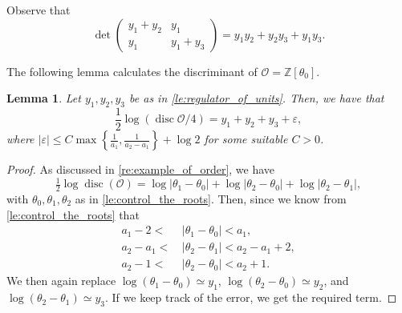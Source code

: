\documentclass[11pt,letterpaper]{amsart}
\newtheorem{lem}[theorem]{Lemma}
\theoremstyle{definition}
\theoremstyle{remark}
\newcommand{\cal}[1]{\mathcal{#1}}
\newcommand{\calO}{\cal O}
\DeclareMathOperator{\disc}{disc}
\begin{document}
	Observe that 
	\begin{equation}
		\det\left(
		\begin{smallmatrix}
			y_1 + y_2 & y_1 \\
			y_1 & y_1 + y_3
		\end{smallmatrix}
		\right)
		= y_1 y_2 + y_2 y_3 + y_1 y_3.
	\end{equation}
	
	The following lemma calculates the discriminant of $\calO = \mathbb{Z}[\theta_0]$.
	\begin{lem}
		\label{le:discriminant}
		Let $y_1,y_2,y_3$ be as in \cref{le:regulator_of_units}. Then, we have that 
		\begin{equation}
			\frac{1}{2}\log (\disc\calO/4 )   = y_1 + y_2 + y_3 + \varepsilon,
		\end{equation}
		where 
		$
		| \varepsilon | \leq  C \max\left\{\tfrac{1}{a_1},\tfrac{1}{a_2-a_1}\right\}+\log 2$
		for some suitable $C > 0$.
	\end{lem}
	\begin{proof}
		As discussed in \cref{re:example_of_order}, we have
		\begin{equation}
			\tfrac{1}{2}\log\disc(\calO) = \log |\theta_1- \theta_0| + \log |\theta_2- \theta_0| + \log|\theta_2 - \theta_1|,
		\end{equation}
		with $\theta_0,\theta_1,\theta_2$ as in \cref{le:control_the_roots}. Then, since we know from \cref{le:control_the_roots} that
		\begin{align}
			a_1 -2	< \, & |\theta_1 - \theta_0|  < a_1, \\
			a_2 -a_1 < \, & |\theta_2 - \theta_1| < a_2 -a_1 + 2 ,\\
			a_2 -1 < \,& |\theta_2 - \theta_0|   < a_2 + 1.
		\end{align}
		We then again replace $\log(\theta_1-\theta_0) \simeq y_1$, $\log(\theta_2 - \theta_0) \simeq y_2$, and $\log(\theta_2 - \theta_1) \simeq y_3$. 
		If we keep track of the error, we get the required term.
	\end{proof}
	
\end{document}
